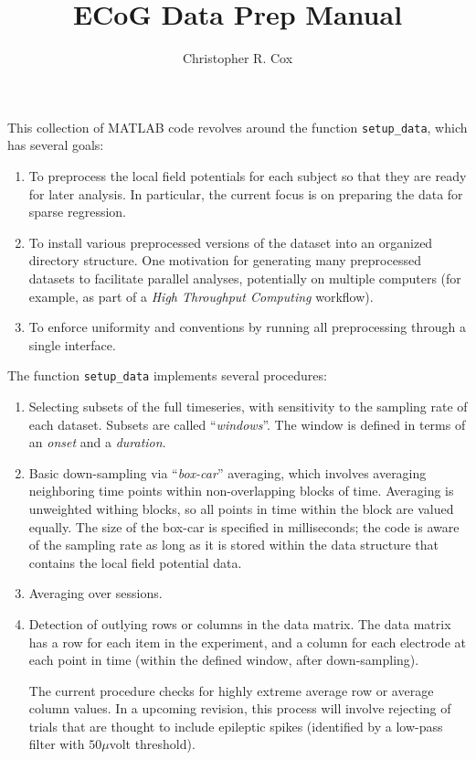 \documentclass[12pt,a4paper]{article}
\author{Christopher R. Cox}
\title{ECoG Data Prep Manual}
\newcommand{\matlab}[0]{MATLAB\textsuperscript{\textregistered}}
\begin{document}
	\maketitle
	
This collection of \matlab{} code revolves around the function \texttt{setup\_data}, which has several goals:

\begin{enumerate}
	\item To preprocess the local field potentials for each subject so that they are ready for later analysis. In particular, the current focus is on preparing the data for sparse regression.
	\item To install various preprocessed versions of the dataset into an organized directory structure. One motivation for generating many preprocessed datasets to facilitate parallel analyses, potentially on multiple computers (for example, as part of a \emph{High Throughput Computing} workflow).
	\item To enforce uniformity and conventions by running all preprocessing through a single interface.
\end{enumerate}

The function \texttt{setup\_data} implements several procedures:

\begin{enumerate}
	\item Selecting subsets of the full timeseries, with sensitivity to the sampling rate of each dataset. Subsets are called ``\emph{windows}''. The window is defined in terms of an \emph{onset} and a \emph{duration}.
	\item Basic down-sampling via ``\emph{box-car}'' averaging, which involves averaging neighboring time points within non-overlapping blocks of time. Averaging is unweighted withing blocks, so all points in time within the block are valued equally. The size of the box-car is specified in milliseconds; the code is aware of the sampling rate as long as it is stored within the data structure that contains the local field potential data.
	\item Averaging over sessions.
	\item Detection of outlying rows or columns in the data matrix. The data matrix has a row for each item in the experiment, and a column for each electrode at each point in time (within the defined window, after down-sampling).
	
	The current procedure checks for highly extreme average row or average column values. In a upcoming revision, this process will involve rejecting of trials that are thought to include epileptic spikes (identified by a low-pass filter with $50 \mu$volt threshold).
\end{enumerate}
\end{document}
